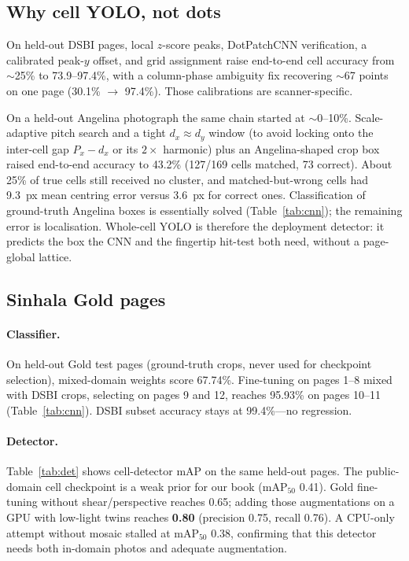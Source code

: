 \documentclass[conference]{IEEEtran}
\begin{document}
\subsection{Why cell YOLO, not dots}
\label{sec:exp-angelina}
On held-out DSBI pages, local $z$-score peaks, DotPatchCNN verification,
a calibrated peak-$y$ offset, and grid assignment raise end-to-end cell
accuracy from $\sim$25\% to 73.9--97.4\%, with a column-phase ambiguity
fix recovering $\sim$67 points on one page (30.1\% $\rightarrow$ 97.4\%).
Those calibrations are scanner-specific.

On a held-out Angelina photograph the same chain started at $\sim$0--10\%.
Scale-adaptive pitch search and a tight $d_x\!\approx\!d_y$ window (to
avoid locking onto the inter-cell gap $P_x-d_x$ or its $2\times$
harmonic) plus an Angelina-shaped crop box raised end-to-end accuracy to
43.2\% (127/169 cells matched, 73 correct). About 25\% of true cells
still received no cluster, and matched-but-wrong cells had 9.3~px mean
centring error versus 3.6~px for correct ones. Classification of
ground-truth Angelina boxes is essentially solved (Table~\ref{tab:cnn});
the remaining error is localisation. Whole-cell YOLO is therefore the
deployment detector: it predicts the box the CNN and the fingertip
hit-test both need, without a page-global lattice.

\subsection{Sinhala Gold pages}
\label{sec:exp-gold}
\paragraph{Classifier.}
On held-out Gold test pages (ground-truth crops, never used for
checkpoint selection), mixed-domain weights score 67.74\%. Fine-tuning
on pages 1--8 mixed with DSBI crops, selecting on pages 9 and 12, reaches
95.93\% on pages 10--11 (Table~\ref{tab:cnn}). DSBI subset accuracy stays
at 99.4\%---no regression.

\paragraph{Detector.}
Table~\ref{tab:det} shows cell-detector mAP on the same held-out pages.
The public-domain cell checkpoint is a weak prior for our book (mAP$_{50}$
0.41). Gold fine-tuning without shear/perspective reaches 0.65; adding
those augmentations on a GPU with low-light twins reaches \textbf{0.80}
(precision 0.75, recall 0.76). A CPU-only attempt without mosaic stalled
at mAP$_{50}$ 0.38, confirming that this detector needs both in-domain
photos and adequate augmentation.
\end{document}
